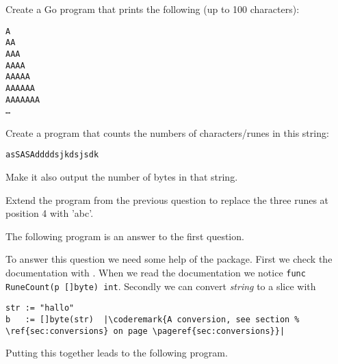 \begin{Exercise}[title={Strings},difficulty=1]
\label{ex:strings}
\Question \label{ex:strings q1} Create a Go program that prints
the following (up to 100 characters):
\begin{alltt}
A
AA
AAA
AAAA
AAAAA
AAAAAA
AAAAAAA
\ldots
\end{alltt}


\Question \label{ex:strings q2} Create a program that counts
the numbers of characters/runes in this string:
\begin{alltt}
asSASA ddd dsjkdsjs dk
\end{alltt}
Make it also output the number of bytes in that string.

\Question \label{ex:string q3} Extend the program from
the previous question to replace the three runes at
position 4 with 'abc'.

\end{Exercise}

\begin{Answer}

\Question The following program is an answer to the first question.


\Question To answer this question we need some help of
the  package. First we check the documentation
with . When we read the documentation
we notice \lstinline{func RuneCount(p []byte) int}. Secondly
we can convert \emph{string} to a  slice with
\begin{lstlisting}
str := "hallo"
b   := []byte(str)  |\coderemark{A conversion, see section %
\ref{sec:conversions} on page \pageref{sec:conversions}}|
\end{lstlisting}

Putting this together leads to the following program.

\end{Answer}
